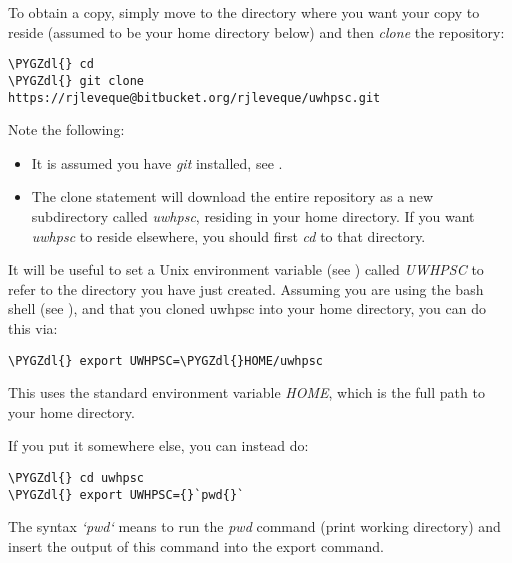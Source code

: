 \documentclass[letterpaper,10pt,english]{sphinxmanual}
\def\PYGZdl{\char`\$}
\begin{document}
To obtain a copy, simply move to the directory where you want your copy to
reside (assumed to be your home directory below)
and then \emph{clone} the repository:

\begin{Verbatim}[commandchars=\\\{\}]
\PYGZdl{} cd
\PYGZdl{} git clone https://rjleveque@bitbucket.org/rjleveque/uwhpsc.git
\end{Verbatim}

Note the following:
\begin{itemize}
\item {} 
It is assumed you have \emph{git} installed, see
{\hyperref[software_installation:software\string-installation]{}}.

\item {} 
The clone statement will download the entire repository as a new
subdirectory called \emph{uwhpsc}, residing in your home directory.  If you
want \emph{uwhpsc} to reside elsewhere, you should first \emph{cd} to that
directory.

\end{itemize}

It will be useful to set a Unix environment variable (see {\hyperref[unix:env]{}}) called
\emph{UWHPSC} to refer to the directory you have just created.  Assuming you are
using the bash shell (see {\hyperref[unix:bash]{}}), and that you cloned uwhpsc
into your home directory, you can do this via:

\begin{Verbatim}[commandchars=\\\{\}]
\PYGZdl{} export UWHPSC=\PYGZdl{}HOME/uwhpsc
\end{Verbatim}

This uses the standard environment variable \emph{HOME}, which is the full path
to your home directory.

If you put it somewhere else, you can instead do:

\begin{Verbatim}[commandchars=\\\{\}]
\PYGZdl{} cd uwhpsc
\PYGZdl{} export UWHPSC={}`pwd{}`
\end{Verbatim}

The syntax
\emph{{}`pwd{}`} means to run the \emph{pwd} command (print working directory) and insert the
output of this command into the export command.
\end{document}
